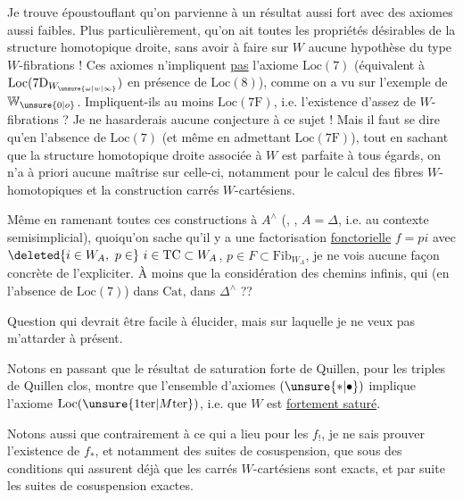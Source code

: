 Je trouve époustouflant qu'on parvienne à un résultat aussi fort avec des axiomes aussi  faibles. Plus particulièrement, qu'on ait toutes les propriétés  désirables de la structure homotopique droite, sans avoir à faire sur $W$ aucune hypothèse du type $W$-fibrations !
Ces axiomes n'impliquent \uline{pas} l'axiome $\mathrm{Loc}(7)$ (équivalent à $\mathrm{Loc}(7\mathrm{D}_{W_{\unsure{\omega|w|\infty}}})$ en présence de $\mathrm{Loc}(8)$), comme on a vu sur l'exemple de $\mathbb{W}_{\unsure{0|o}}$. Impliquent-ils  au moins $\mathrm{Loc}(7\mathrm{F})$, i.e. l'existence d'assez de $W$-fibrations ? Je ne hasarderais aucune conjecture à ce sujet ! Mais il faut  se dire qu'en l'absence de $\mathrm{Loc}(7)$ (et même
en admettant $\mathrm{Loc}(7\mathrm{F})$), tout en sachant que la structure homotopique droite associée à $W$ est parfaite à tous égards, on n'a à priori aucune maîtrise sur celle-ci, notamment pour le calcul des fibres $W$-homotopiques et la construction  carrés $W$-cartésiens.

Même en ramenant toutes ces constructions à $A^{\wedge}$ (, , $A=\mathbb{\Delta}$, \deleted{\unsure{)}} i.e.  au contexte semisimplicial), quoiqu'on sache qu'il y a une factorisation \uline{fonctorielle} $f=pi$ avec $\deleted{i\in W_A,\ p\in}\ i\in \mathrm{TC}\subset W_A$, $p\in F\subset\mathrm{Fib}_{W_A}$, je ne vois aucune façon concrète de l'expliciter.
À moins que la considération des chemins infinis, qui (en l'absence de $\mathrm{Loc}(7)$)   dans $\mathrm{Cat}$,   dans $\mathbb{\Delta}^{\wedge}$ ??

Question qui devrait être facile à élucider, mais sur laquelle je ne veux pas m'attarder à présent.

Notons en passant que le résultat de saturation forte de Quillen, pour les triples de Quillen clos, montre que l'ensemble d'axiomes $(\unsure{*|\bullet})$ implique  l'axiome $\mathrm{Loc}(\unsure{1\mathrm{ter}|M\mathrm{ter}})$, i.e. que $W$ est \uline{fortement saturé}.

Notons aussi que contrairement à ce qui a lieu pour les $f_!$, je ne sais prouver l'existence de $f_*$, et notamment des suites de cosuspension, que sous des conditions  qui assurent déjà que les carrés $W$-cartésiens sont exacts, et par suite les suites de cosuspension exactes.

